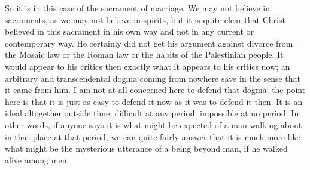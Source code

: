 So it is in this case of the sacrament of marriage. We may not believe in sacraments, as we may not believe in spirits, but it is quite clear that Christ believed in this sacrament in his own way and not in any current or contemporary way. He certainly did not get his argument against divorce from the Mosaic law or the Roman law or the habits of the Palestinian people. It would appear to his critics then exactly what it appears to his critics now; an arbitrary and transcendental dogma coming from nowhere save in the sense that it came from him. I am not at all concerned here to defend that dogma; the point here is that it is just as easy to defend it now as it was to defend it then. It is an ideal altogether outside time; difficult at any period; impossible at no period. In other words, if anyone says it is what might be expected of a man walking about in that place at that period, we can quite fairly answer that it is much more like what might be the mysterious utterance of a being beyond man, if he walked alive among men.

